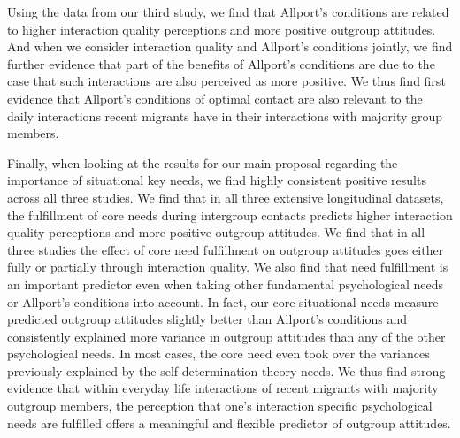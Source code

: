 \documentclass[man, 12pt, a4paper, mask]{apa7}
\theoremstyle{break}
\theoremstyle{plain}
\begin{document}
Using the data from our third study, we find that Allport's conditions are related to higher interaction quality perceptions and more positive outgroup attitudes. And when we consider interaction quality and Allport's conditions jointly, we find further evidence that part of the benefits of Allport's conditions are due to the case that such interactions are also perceived as more positive. We thus find first evidence that Allport's conditions of optimal contact are also relevant to the daily interactions recent migrants have in their interactions with majority group members. 

Finally, when looking at the results for our main proposal regarding the importance of situational key needs, we find highly consistent positive results across all three studies. We find that in all three extensive longitudinal datasets, the fulfillment of core needs during intergroup contacts predicts higher interaction quality perceptions and more positive outgroup attitudes. We find that in all three studies the effect of core need fulfillment on outgroup attitudes goes either fully or partially through interaction quality. We also find that need fulfillment is an important predictor even when taking other fundamental psychological needs or Allport's conditions into account. In fact, our core situational needs measure predicted outgroup attitudes slightly better than Allport's conditions and consistently explained more variance in outgroup attitudes than any of the other psychological needs. In most cases, the core need even took over the variances previously explained by the self-determination theory needs. We thus find strong evidence that within everyday life interactions of recent migrants with majority outgroup members, the perception that one's interaction specific psychological needs are fulfilled offers a meaningful and flexible predictor of outgroup attitudes.
\end{document}
